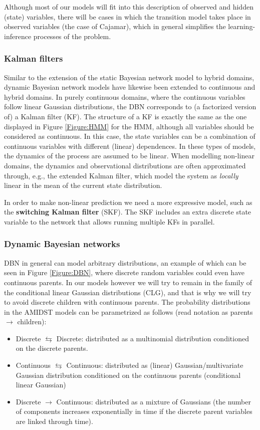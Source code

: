 Although most of our models will fit into this description of observed and hidden (state) variables, there will be cases in which the transition model takes place in observed variables (the case of Cajamar), which in general simplifies the learning-inference processes of the problem.



\subsubsection*{Kalman filters}
Similar to the extension of the static Bayesian network model to hybrid domains, dynamic Bayesian network models have likewise been extended to continuous and hybrid domains. In purely continuous domains, where the continuous variables follow linear Gaussian distributions, the DBN corresponds to (a factorized version of) a Kalman filter (KF). The structure of a KF is exactly the same as the one displayed in Figure \ref{Figure:HMM} for the HMM, although all variables should be considered as continuous. In this case, the state variables can be a combination of continuous variables with different (linear) dependences. In these types of models, the dynamics of the process are assumed to be linear. When modelling non-linear domains, the dynamics and observational distributions are often approximated through, e.g., the extended Kalman filter, which model the system as \textit{locally} linear in the mean of the current state distribution. 

In order to make non-linear prediction we need a more expressive model, such as the \textbf{switching Kalman filter} (SKF). The SKF includes an extra discrete state variable to the network that allows running multiple KFs in parallel. 

\subsubsection*{Dynamic Bayesian networks}

DBN in general can model arbitrary distributions, an example of which can be seen in Figure \ref{Figure:DBN}, where discrete random variables could even have continuous parents. In our models however we will try to remain in the family of the conditional linear Gaussian distributions (CLG), and that is why we will try to avoid discrete children with continuous parents. The probability distributions in the AMIDST models can be parametrized as follows (read notation as parents $\rightarrow$ children):
\begin{itemize}
\item Discrete $\leftrightarrows$ Discrete: distributed as a multinomial distribution conditioned on the discrete parents.
\item Continuous $\leftrightarrows$ Continuous: distributed as (linear) Gaussian/multivariate Gaussian distribution conditioned on the continuous parents (conditional linear Gaussian)
\item Discrete $\rightarrow$ Continuous: distributed as a mixture of Gaussians (the number of components increases exponentially in time if the discrete parent variables are linked through time). 
\end{itemize}


